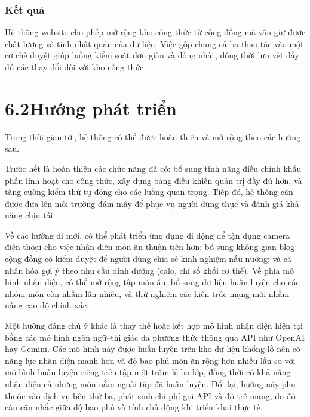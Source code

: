 \documentclass[13pt,a4paper]{article}
\begin{document}
\subsubsection*{Kết quả}
Hệ thống website cho phép mở rộng kho công thức từ cộng đồng mà vẫn giữ được chất lượng và tính nhất quán của dữ liệu. Việc gộp chung cả ba thao tác vào một cơ chế duyệt giúp luồng kiểm soát đơn giản và đồng nhất, đồng thời lưu vết đầy đủ các thay đổi đối với kho công thức.

\section*{6.2\quad Hướng phát triển}
Trong thời gian tới, hệ thống có thể được hoàn thiện và mở rộng theo các hướng sau.

Trước hết là hoàn thiện các chức năng đã có: bổ sung tính năng điều chỉnh khẩu phần linh hoạt cho công thức, xây dựng bảng điều khiển quản trị đầy đủ hơn, và tăng cường kiểm thử tự động cho các luồng quan trọng. Tiếp đó, hệ thống cần được đưa lên môi trường đám mây để phục vụ người dùng thực và đánh giá khả năng chịu tải.

Về các hướng đi mới, có thể phát triển ứng dụng di động để tận dụng camera điện thoại cho việc nhận diện món ăn thuận tiện hơn; bổ sung không gian blog cộng đồng có kiểm duyệt để người dùng chia sẻ kinh nghiệm nấu nướng; và cá nhân hóa gợi ý theo nhu cầu dinh dưỡng (calo, chỉ số khối cơ thể). Về phía mô hình nhận diện, có thể mở rộng tập món ăn, bổ sung dữ liệu huấn luyện cho các nhóm món còn nhầm lẫn nhiều, và thử nghiệm các kiến trúc mạng mới nhằm nâng cao độ chính xác.

Một hướng đáng chú ý khác là thay thế hoặc kết hợp mô hình nhận diện hiện tại bằng các mô hình ngôn ngữ--thị giác đa phương thức thông qua API như OpenAI hay Gemini. Các mô hình này được huấn luyện trên kho dữ liệu khổng lồ nên có năng lực nhận diện mạnh hơn và độ bao phủ món ăn rộng hơn nhiều lần so với mô hình huấn luyện riêng trên tập một trăm lẻ ba lớp, đồng thời có khả năng nhận diện cả những món nằm ngoài tập đã huấn luyện. Đổi lại, hướng này phụ thuộc vào dịch vụ bên thứ ba, phát sinh chi phí gọi API và độ trễ mạng, do đó cần cân nhắc giữa độ bao phủ và tính chủ động khi triển khai thực tế.
\end{document}

